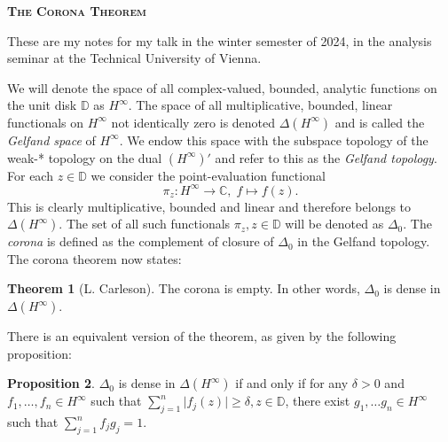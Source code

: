 \documentclass[letterpaper, 11pt]{article}
\newcommand{\C}{\mathbb{C}}
\newcommand{\D}{\mathbb{D}}
\newcommand{\1}{\mathds{1}}
\theoremstyle{definition}
\newtheorem{theorem}{Theorem}
\newtheorem{proposition}[theorem]{Proposition}
\begin{document}
\author{\normalsize Ian Hornik}
\date{\vspace{-0.8em}\normalsize\today}


\begin{center}
  {\Large\scshape\bfseries{The Corona Theorem}}
\end{center}

These are my notes for my talk in the winter semester of 2024, in the analysis seminar at the Technical University of Vienna.

We will denote the space of all complex-valued, bounded, analytic functions on the unit disk $\D$ as $H^\infty$. The space of all multiplicative, bounded, linear functionals on $H^\infty$ not identically zero is denoted $\Delta(H^\infty)$ and is called the \emph{Gelfand space} of $H^\infty$. We endow this space with the subspace topology of the weak\nobreakdash-* topology on the dual $(H^\infty)'$ and refer to this as the \emph{Gelfand topology}. For each $z \in \D$ we consider the point-evaluation functional
\begin{equation*}
  \pi_z : H^\infty \to \C,\; f \mapsto f(z).
\end{equation*}
This is clearly multiplicative, bounded and linear and therefore belongs to $\Delta(H^\infty)$. The set of all such functionals $\pi_z, z \in \D$ will be denoted as $\Delta_0$. The \emph{corona} is defined as the complement of closure of $\Delta_0$ in the Gelfand topology. The corona theorem now states:

\begin{theorem}[L. Carleson]
  The corona is empty. In other words, $\Delta_0$ is dense in $\Delta(H^\infty)$.
\end{theorem}

There is an equivalent version of the theorem, as given by the following proposition:

\begin{proposition}
  $\Delta_0$ is dense in $\Delta(H^\infty)$ if and only if for any $\delta > 0$ and $f_1, \dots, f_n \in H^\infty$ such that $\sum_{j=1}^n \vert f_j(z) \vert \geq \delta, z \in \D$, there exist $g_1, \dots g_n \in H^\infty$ such that $\sum_{j=1}^n f_j g_j = 1$.
\end{proposition}
\end{document}
